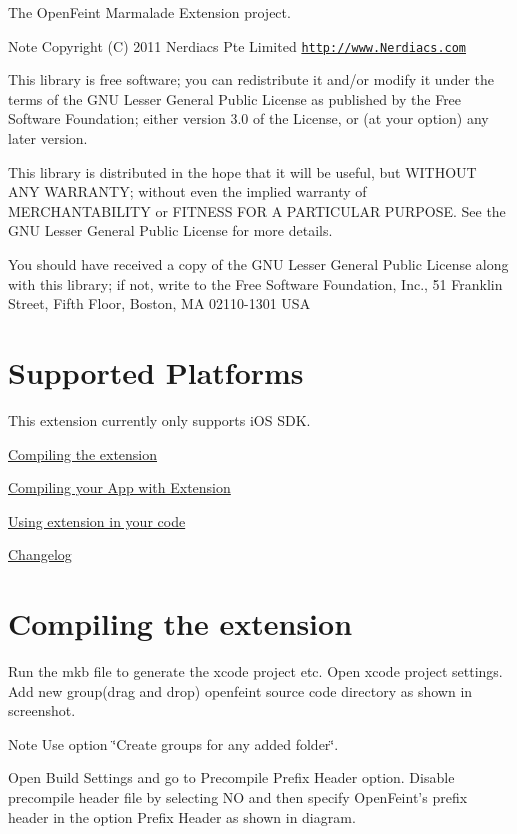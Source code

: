 The OpenFeint Marmalade Extension project. \begin{DoxyNote}{Note}
Copyright (C) 2011 Nerdiacs Pte Limited \hyperlink{}{\href{http://www.Nerdiacs.com}{\tt http://www.Nerdiacs.com} }

This library is free software; you can redistribute it and/or modify it under the terms of the GNU Lesser General Public License as published by the Free Software Foundation; either version 3.0 of the License, or (at your option) any later version.

This library is distributed in the hope that it will be useful, but WITHOUT ANY WARRANTY; without even the implied warranty of MERCHANTABILITY or FITNESS FOR A PARTICULAR PURPOSE. See the GNU Lesser General Public License for more details.

You should have received a copy of the GNU Lesser General Public License along with this library; if not, write to the Free Software Foundation, Inc., 51 Franklin Street, Fifth Floor, Boston, MA 02110-\/1301 USA
\end{DoxyNote}
\hypertarget{index_sec_1}{}\section{Supported Platforms}\label{index_sec_1}
This extension currently only supports iOS SDK.

\hyperlink{index_sec_2}{Compiling the extension}

\hyperlink{index_sec_3}{Compiling your App with Extension}

\hyperlink{index_sec_4}{Using extension in your code}

\hyperlink{index_sec_5}{Changelog}\hypertarget{index_sec_2}{}\section{Compiling the extension}\label{index_sec_2}
Run the mkb file to generate the xcode project etc. Open xcode project settings. Add new group(drag and drop) openfeint source code directory as shown in screenshot. \begin{DoxyNote}{Note}
Use option \char`\"{}Create groups for any added folder\char`\"{}.
\end{DoxyNote}
 Open Build Settings and go to Precompile Prefix Header option. Disable precompile header file by selecting NO and then specify OpenFeint's prefix header in the option Prefix Header as shown in diagram.




